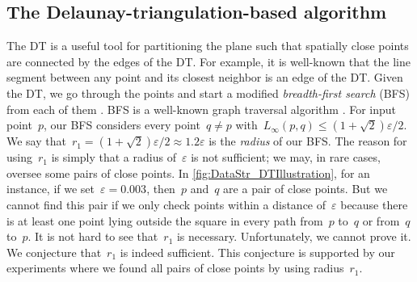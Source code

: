 \subsection{The Delaunay-triangulation-based algorithm}
\label{sec:DataStr_DTAlgorithm} 

The DT is a useful tool for partitioning the plane 
such that spatially close points are connected
by the edges of the DT. 
For example, it is well-known that
the line segment between any point and its closest neighbor
is an edge of the DT.
Given the DT, we go through the points 
and start a modified \emph{breadth-first search} (BFS) 
from each of them
\parencite[e.g.,][]{Maus2010AllCN,Rahmati2013}. 
BFS is a well-known graph traversal algorithm
\parencite[chapter 22]{Cormen2009}. 
For input point~$p$, 
our BFS considers every point~$q\ne p$ 
with~$L_{\infty}(p,q)\le (1+\sqrt{2})\varepsilon /2$. 
We say that~$r_{1}=(1+\sqrt{2})\varepsilon /2\approx 
1.2\varepsilon$ 
is the \emph{radius} of our BFS. 
The reason for using~$r_{1} $ is simply that 
a radius of~$\varepsilon$ is not sufficient; 
we may, in rare cases, oversee some pairs of close points. 
In \fig\ref{fig:DataStr_DTIllustration}, for an instance, 
if we set~$\varepsilon =0.003$, 
then~$p$ and~$q$ are a pair of close points. 
But we cannot find this pair if we only check points 
within a distance of~$\varepsilon$
because there is at least one point lying outside the square 
in every path from~$p$ to~$q$ or from~$q$ to~$p$. 
It is not hard to see that~$r_{1}$ is necessary. Unfortunately, we cannot prove it. 
We conjecture that~$r_{1}$ is indeed sufficient. 
This conjecture is supported by our experiments where 
we found all pairs of close points by using radius~$r_{1}$.



